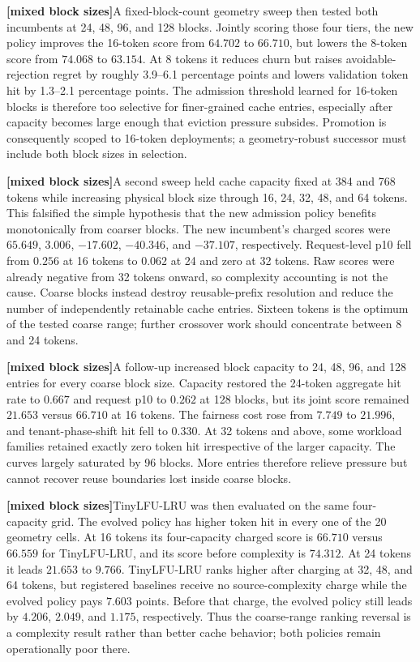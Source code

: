 \documentclass[11pt]{article}
\newcommand{\mixedblocktag}{\textbf{\color{navy}[mixed block sizes]}}
\begin{document}
\mixedblocktag A fixed-block-count geometry sweep then tested both incumbents at 24, 48, 96, and
128 blocks.  Jointly scoring those four tiers, the new policy improves the 16-token
score from \(64.702\) to \(66.710\), but lowers the 8-token score from \(74.068\) to
\(63.154\).  At 8 tokens it reduces churn but raises avoidable-rejection regret by
roughly 3.9--6.1 percentage points and lowers validation token hit by 1.3--2.1
percentage points.  The admission threshold learned for 16-token blocks is therefore
too selective for finer-grained cache entries, especially after capacity becomes
large enough that eviction pressure subsides.  Promotion is consequently scoped to
16-token deployments; a geometry-robust successor must include both block sizes in
selection.

\mixedblocktag A second sweep held cache capacity fixed at 384 and 768 tokens while increasing
physical block size through 16, 24, 32, 48, and 64 tokens.  This falsified the
simple hypothesis that the new admission policy benefits monotonically from coarser
blocks.  The new incumbent's charged scores were \(65.649\), \(3.006\),
\(-17.602\), \(-40.346\), and \(-37.107\), respectively.  Request-level p10 fell
from \(0.256\) at 16 tokens to \(0.062\) at 24 and zero at 32 tokens.  Raw scores
were already negative from 32 tokens onward, so complexity accounting is not the
cause.  Coarse blocks instead destroy reusable-prefix resolution and reduce the
number of independently retainable cache entries.  Sixteen tokens is the optimum
of the tested coarse range; further crossover work should concentrate between 8 and
24 tokens.

\mixedblocktag A follow-up increased block capacity to 24, 48, 96, and 128 entries for every coarse
block size.  Capacity restored the 24-token aggregate hit rate to \(0.667\) and
request p10 to \(0.262\) at 128 blocks, but its joint score remained \(21.653\)
versus \(66.710\) at 16 tokens.  The fairness cost rose from \(7.749\) to \(21.996\),
and tenant-phase-shift hit fell to \(0.330\).  At 32 tokens and above, some workload
families retained exactly zero token hit irrespective of the larger capacity.  The
curves largely saturated by 96 blocks.  More entries therefore relieve pressure but
cannot recover reuse boundaries lost inside coarse blocks.

\mixedblocktag TinyLFU-LRU was then evaluated on the same four-capacity grid.  The evolved policy
has higher token hit in every one of the 20 geometry cells.  At 16 tokens its
four-capacity charged score is \(66.710\) versus \(66.559\) for TinyLFU-LRU, and
its score before complexity is \(74.312\).  At 24 tokens it leads \(21.653\) to
\(9.766\).  TinyLFU-LRU ranks higher after charging at 32, 48, and 64 tokens, but
registered baselines receive no source-complexity charge while the evolved policy
pays \(7.603\) points.  Before that charge, the evolved policy still leads by
\(4.206\), \(2.049\), and \(1.175\), respectively.  Thus the coarse-range ranking
reversal is a complexity result rather than better cache behavior; both policies
remain operationally poor there.
\end{document}
